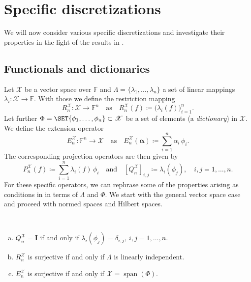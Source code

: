 \documentclass[a4paper]{paper}
\newcommand*{\SPC}[1]{{\ensuremath{\mathscr{#1}}}}
\newcommand*{\SPCX}{\SPC{X}}
\newcommand*{\FIELD}{{\ensuremath{\mathbb{F}}}}
\newcommand*{\Fn}{{\ensuremath{\FIELD^n}}}
\newcommand*{\EXT}[2]{\ensuremath{E_{#1}^{#2}}}
\newcommand*{\REST}[2]{\ensuremath{R_{#1}^{#2}}}
\newcommand*{\PROJ}[2]{\ensuremath{P_{#1}^{#2}}}
\newcommand*{\COPROJ}[2]{\ensuremath{Q_{#1}^{#2}}}
\newcommand*{\RnX}{{\ensuremath{\REST{n}{\SPC{X}}}}}
\newcommand*{\EnX}{{\ensuremath{\EXT{n}{\SPC{X}}}}}
\newcommand*{\PnX}{{\ensuremath{\PROJ{n}{\SPCX}}}}
\newcommand*{\QnX}{{\ensuremath{\COPROJ{n}{\SPCX}}}}
\DeclareMathOperator{\SPAN}{{span}}
\DeclareMathOperator{\DEFEQ}{{\coloneqq}}
\newcommand*{\BDalpha}{\boldsymbol{\alpha}}
\newcommand*{\BDI}{\boldsymbol{I}}
\begin{document}
\section{Specific discretizations}
\label{sec:specif}

We will now consider various specific discretizations and investigate their properties in the light of the 
results in .



\subsection{Functionals and dictionaries}
\label{subsec:specif:funct}

Let $\SPCX$ be a vector space over $\FIELD$ and $\Lambda = \{\lambda_1, \dots, \lambda_n\}$ a set of linear mappings
$\lambda_i \colon \SPCX \to \FIELD$. With those we define the restriction mapping
%
\begin{equation*}
 \RnX \colon \SPCX \to \Fn \quad \text{as} \quad \RnX(f) \DEFEQ  \big( \lambda_i(f) \big)_{i=1}^n.
\end{equation*}
%
Let further $\Phi=\SET{\phi_1, \dots, \phi_n} \subset \SPCX$ be a set of elements (a \emph{dictionary}) 
in 
$\SPCX$. We 
define the extension operator
%
\begin{equation*}
 \EnX \colon \Fn \to \SPCX \quad \text{as} \quad \EnX(\BDalpha) \DEFEQ  \sum_{i=1}^n \alpha_i\, \phi_i.
\end{equation*}
%
The corresponding projection operators are then given by
%
\begin{equation*}
 \PnX(f) \DEFEQ  \sum_{i=1}^n \lambda_i(f)\, \phi_i
 \quad \text{and} \quad
 \left[ \QnX \right]_{i,j} \DEFEQ  \lambda_i(\phi_j),\quad i,j=1,\dots,n.
\end{equation*}
%
For these specific operators, we can rephrase some of the properties arising as conditions in  
in terms of $\Lambda$ and $\Phi$. We start with the general vector space case and proceed with normed spaces and 
Hilbert spaces.


\begin{lemma}~
 \label{lemma:specif:funct:op_prop_vecspace}
 \begin{enumerate}[(a)]
  \item \label{lemma:specif:funct:op_prop_vecspace:Q_identity}
  $\QnX = \BDI$ if and only if $\lambda_i(\phi_j) = \delta_{i,j},\ i,j=1,\dots,n$.
  
  \item \label{lemma:specif:funct:op_prop_vecspace:R_surjective}
  $\RnX$ is surjective if and only if $\Lambda$ is linearly independent.
  
  \item \label{lemma:specif:funct:op_prop_vecspace:E_surjective}
  $\EnX$ is surjective if and only if $\SPCX = \SPAN(\Phi)$.
 \end{enumerate}
\end{lemma}
\vspace{1em}
\end{document}
